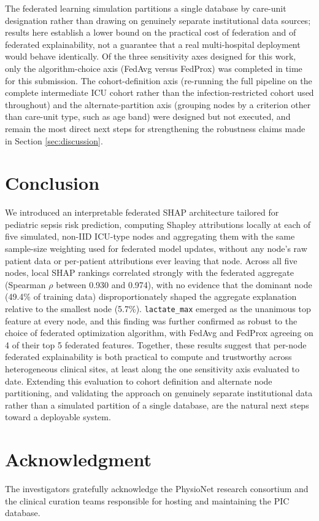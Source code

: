 \documentclass{svproc}
\begin{document}
The federated learning simulation partitions a single database by care-unit designation rather than drawing on genuinely separate institutional data sources; results here establish a lower bound on the practical cost of federation and of federated explainability, not a guarantee that a real multi-hospital deployment would behave identically. Of the three sensitivity axes designed for this work, only the algorithm-choice axis (FedAvg versus FedProx) was completed in time for this submission. The cohort-definition axis (re-running the full pipeline on the complete intermediate ICU cohort rather than the infection-restricted cohort used throughout) and the alternate-partition axis (grouping nodes by a criterion other than care-unit type, such as age band) were designed but not executed, and remain the most direct next steps for strengthening the robustness claims made in Section \ref{sec:discussion}.

\section{Conclusion}\label{sec:concl}

We introduced an interpretable federated SHAP architecture tailored for pediatric sepsis risk prediction, computing Shapley attributions locally at each of five simulated, non-IID ICU-type nodes and aggregating them with the same sample-size weighting used for federated model updates, without any node's raw patient data or per-patient attributions ever leaving that node. Across all five nodes, local SHAP rankings correlated strongly with the federated aggregate (Spearman $\rho$ between 0.930 and 0.974), with no evidence that the dominant node (49.4\% of training data) disproportionately shaped the aggregate explanation relative to the smallest node (5.7\%). \texttt{lactate\_max} emerged as the unanimous top feature at every node, and this finding was further confirmed as robust to the choice of federated optimization algorithm, with FedAvg and FedProx agreeing on 4 of their top 5 federated features. Together, these results suggest that per-node federated explainability is both practical to compute and trustworthy across heterogeneous clinical sites, at least along the one sensitivity axis evaluated to date. Extending this evaluation to cohort definition and alternate node partitioning, and validating the approach on genuinely separate institutional data rather than a simulated partition of a single database, are the natural next steps toward a deployable system.

\section*{Acknowledgment}
The investigators gratefully acknowledge the PhysioNet research consortium and the clinical curation teams responsible for hosting and maintaining the PIC database.



\end{document}
